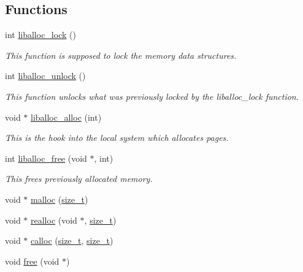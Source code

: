 \subsection*{Functions}
\begin{DoxyCompactItemize}
\item 
int \hyperlink{a00038_a8b5670e4594b0b6f8be78fe17f0c3b53_a8b5670e4594b0b6f8be78fe17f0c3b53}{liballoc\+\_\+lock} ()
\begin{DoxyCompactList}\small\item\em This function is supposed to lock the memory data structures. \end{DoxyCompactList}\item 
int \hyperlink{a00038_aedc23f198b2882d41d0caa316453967b_aedc23f198b2882d41d0caa316453967b}{liballoc\+\_\+unlock} ()
\begin{DoxyCompactList}\small\item\em This function unlocks what was previously locked by the liballoc\+\_\+lock function. \end{DoxyCompactList}\item 
void $\ast$ \hyperlink{a00038_ae002bb742dfc63fe18a305bd14bdf692_ae002bb742dfc63fe18a305bd14bdf692}{liballoc\+\_\+alloc} (int)
\begin{DoxyCompactList}\small\item\em This is the hook into the local system which allocates pages. \end{DoxyCompactList}\item 
int \hyperlink{a00038_a1653870893230580e5d605148aa3c37a_a1653870893230580e5d605148aa3c37a}{liballoc\+\_\+free} (void $\ast$, int)
\begin{DoxyCompactList}\small\item\em This frees previously allocated memory. \end{DoxyCompactList}\item 
void $\ast$ \hyperlink{a00038_a1c8580582aae58105f16108d4ec89e9a_a1c8580582aae58105f16108d4ec89e9a}{malloc} (\hyperlink{a00038_a7c94ea6f8948649f8d181ae55911eeaf_a7c94ea6f8948649f8d181ae55911eeaf}{size\+\_\+t})
\item 
void $\ast$ \hyperlink{a00038_afa148085b6fa9594b4c35e100d94a183_afa148085b6fa9594b4c35e100d94a183}{realloc} (void $\ast$, \hyperlink{a00038_a7c94ea6f8948649f8d181ae55911eeaf_a7c94ea6f8948649f8d181ae55911eeaf}{size\+\_\+t})
\item 
void $\ast$ \hyperlink{a00038_a77e880b1033d5a912be4333fc5d31eef_a77e880b1033d5a912be4333fc5d31eef}{calloc} (\hyperlink{a00038_a7c94ea6f8948649f8d181ae55911eeaf_a7c94ea6f8948649f8d181ae55911eeaf}{size\+\_\+t}, \hyperlink{a00038_a7c94ea6f8948649f8d181ae55911eeaf_a7c94ea6f8948649f8d181ae55911eeaf}{size\+\_\+t})
\item 
void \hyperlink{a00038_af07d89f5ceaea0c7c8252cc41fd75f37_af07d89f5ceaea0c7c8252cc41fd75f37}{free} (void $\ast$)
\end{DoxyCompactItemize}


